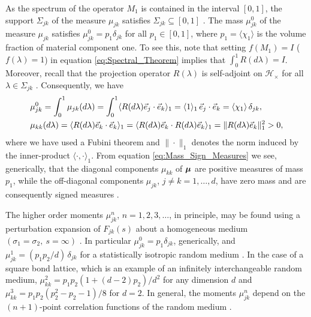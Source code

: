 \documentclass{cmslatex}
\newcommand\bmu{\mbox{\boldmath${\mu}$}}
\begin{document}
As the spectrum of the operator $M_1$ is contained in the interval
$[0,1]$, the support $\Sigma_{jk}$ of the measure $\mu_{jk}$ satisfies $\Sigma_{jk}\subseteq[0,1]$
\cite{Reed-1980}. The mass $\mu_{jk}^0$ of the measure $\mu_{jk}$ satisfies 
$\mu_{jk}^0=p_1\delta_{jk}$ for all $p_1\in[0,1]$, where $p_1=\langle\chi_1\rangle$ is the
volume fraction of material component one. To see this, note that 
setting $f(M_1)=I$ ($f(\lambda)=1$) in equation \eqref{eq:Spectral_Theorem}
implies that $\int_0^1R(d\lambda)=I$. Moreover, recall that the projection 
operator $R(\lambda)$ is self-adjoint on $\mathscr{H}_\times$ for all $\lambda\in\Sigma_{jk}$ 
\cite{Reed-1980,Stone:64}. Consequently, we have    
%
\begin{align}\label{eq:Mass_Sign_Measures}
   &\mu_{jk}^0=\int_0^1\mu_{jk}(d\lambda)=\int_0^1\langle R(d\lambda)\vec{e}_j\cdot\vec{e}_k\rangle_1
        =\langle1\rangle_1\,\vec{e}_j\cdot\vec{e}_k
        =\langle\chi_1\rangle\,\delta_{jk},\\
   &\mu_{kk}(d\lambda)=\langle R(d\lambda)\vec{e}_k\cdot\vec{e}_k\rangle_1
       =\langle R(d\lambda)\vec{e}_k\cdot R(d\lambda)\vec{e}_k\rangle_1
       =\|R(d\lambda)\vec{e}_k\|_1^2>0,\notag
\end{align}
%
where we have used a Fubini theorem \cite{Folland:99}
and $\|\cdot\|_1$ denotes the norm induced by the inner-product
$\langle\cdot,\cdot\rangle_1$. From equation \eqref{eq:Mass_Sign_Measures} we see,
generically, that the diagonal components $\mu_{kk}$ of $\bmu$ are 
positive measures of mass $p_1$, while the off-diagonal components
$\mu_{jk}$, $j\neq k=1,\ldots,d$, have zero mass and are consequently signed
measures \cite{Folland:99,Rudin:87}.



The higher order moments $\mu_{jk}^n$, $n=1,2,3,\ldots$, in principle, may be
found using a perturbation expansion of $F_{jk}(s)$ about a
homogeneous medium $(\sigma_1=\sigma_2, \ s=\infty)$ \cite{Golden:CMP-473}. In
particular $\mu_{jk}^0=p_1\delta_{jk}$, generically, and $\mu_{jk}^1=(p_1p_2/d)\,\delta_{jk}$
for a statistically isotropic random medium 
\cite{Golden:CMP-473,Bruno:JSP-365}. In the case of a  
square bond lattice, which is an example of an infinitely
interchangeable random medium, $\mu_{kk}^2=p_1p_2(1+(d-2)p_2)/d^2$
for any dimension $d$ and $\mu_{kk}^3=p_1p_2(p_2^2-p_2-1)/8$ for $d=2$.  
In general, the moments $\mu_{jk}^n$ depend on the $(n+1)$-point
correlation functions of the random medium
\cite{Golden:CMP-473,Bruno:JSP-365}.
\end{document}
